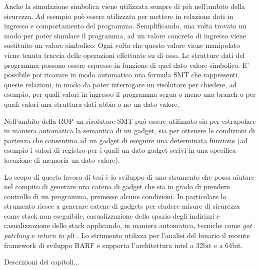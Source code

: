 Anche la simulazione simbolica viene utilizzata sempre di più
nell'ambito della sicurezza. Ad esempio può essere utilizzata per
mettere in relazione dati in ingresso e comportamento del
programma. Semplificando, una volta trovato un modo per poter simulare
il programma, ad un valore concreto di ingresso viene sostituito un
valore simbolico. Ogni volta che questo valore viene manipolato viene
tenuta traccia delle operazioni effettuate su di esso. Le strutture
dati del programma possono essere espresse in funzione di quel dato
valore simbolico. E' possibile poi ricavare in modo automatico una
formula SMT che rappresenti queste relazioni, in modo da poter
interrogare un risolutore per chiedere, ad esempio, per quali valori
in ingresso il programma segua o meno una branch o per quali valori
una struttura dati abbia o no un dato valore.

Nell'ambito della ROP un risolutore SMT può essere utilizzato sia per
estrapolare in maniera automatica la semantica di un gadget, sia per
ottenere le condizioni di partenza che consentino ad un gadget di
eseguire una determinata funzione (ad esempio i valori di registro per
i quali un dato gadget scrivi in una specifica locazione di memoria un
dato valore).

Lo scopo di questo lavoro di tesi è lo sviluppo di uno strumento che
possa aiutare nel compito di generare una catena di gadget che sia in
grado di prendere controllo di un programma, premesse alcune
condizioni. In particolare lo strumento riesce a generare catene di
gadgets per eludere misure di sicurezza come stack non eseguibile,
casualizzazione dello spazio degli indirizzi e casualizzazione dello
stack applicando, in maniera automatica, tecniche come \emph{got
  patching} e \emph{return to plt} \cite{roglia:2009}. Lo strumento
utilizza per l'analisi del binario il recente framework di sviluppo
BARF \cite{Heitman-14} e supporta l'architettura intel a 32bit e a
64bit.

Descrizioni dei capitoli...




